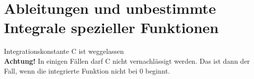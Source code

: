 \section{Ableitungen und unbestimmte Integrale spezieller Funktionen}
\label{sec:ablintspez}
Integrationskonstante C ist weggelassen\\
\textbf{Achtung!} In einigen Fällen darf C nicht vernachlässigt werden. 
Das ist dann der Fall, wenn die integrierte Funktion nicht bei 0 beginnt. \\\\
\footnotesize
